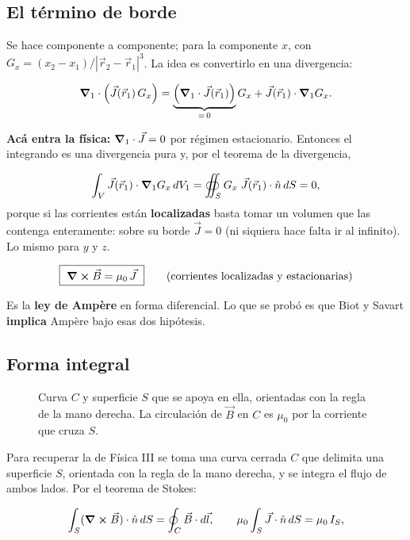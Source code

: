 \documentclass[12pt,a4paper]{article}
\begin{document}
\subsection{El término de borde}

Se hace componente a componente; para la componente $x$, con
$G_x = (x_2-x_1)/|\vec r_2-\vec r_1|^3$. La idea es convertirlo en una
divergencia:

\[
\vnabla_1\cdot\left(\vec J(\vec r_1)\,G_x\right)
= \underbrace{\left(\vnabla_1\cdot\vec J(\vec r_1)\right)}_{=\,0}G_x
+ \vec J(\vec r_1)\cdot\vnabla_1 G_x .
\]

\textbf{Acá entra la física:} $\vnabla_1\cdot\vec J = 0$ por régimen estacionario.
Entonces el integrando es una divergencia pura y, por el teorema de la
divergencia,

\[
\int_V \vec J(\vec r_1)\cdot\vnabla_1 G_x\,dV_1
= \oiint_S G_x\;\vec J(\vec r_1)\cdot\hat n\,dS = 0,
\]
porque si las corrientes están \textbf{localizadas} basta tomar un volumen que las
contenga enteramente: sobre su borde $\vec J = 0$ (ni siquiera hace falta ir al
infinito). Lo mismo para $y$ y $z$.

\begin{keybox}
\[
\boxed{\ \curl \vec B = \mu_0\,\vec J\ }
\qquad\text{(corrientes localizadas y estacionarias)}
\]
\end{keybox}

Es la \textbf{ley de Ampère} en forma diferencial. Lo que se probó es que Biot y
Savart \textbf{implica} Ampère bajo esas dos hipótesis.

\subsection{Forma integral}

\begin{figure}[H]
  \centering
  
  \caption{Curva $C$ y superficie $S$ que se apoya en ella, orientadas con la regla de la mano derecha. La circulación de $\vec B$ en $C$ es $\mu_0$ por la corriente que cruza $S$.}
\end{figure}

Para recuperar la de Física III se toma una curva cerrada $C$ que delimita una
superficie $S$, orientada con la regla de la mano derecha, y se integra el
flujo de ambos lados. Por el teorema de Stokes:

\[
\int_S (\curl \vec B)\cdot\hat n\,dS = \oint_C \vec B\cdot d\vec l,
\qquad
\mu_0\int_S \vec J\cdot\hat n\,dS = \mu_0\,I_S,
\]
\end{document}

